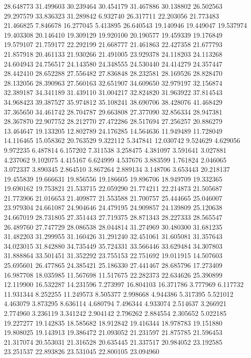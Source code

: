 28.648773
31.499603
30.239464
30.454179
31.467886
30.138802
26.502563
29.297579
33.836323
31.289842
6.932740
26.317711
22.203056
21.773483
21.466825
7.846678
16.277045
5.413895
26.640543
19.140946
19.449047
19.537974
19.403308
20.146410
19.309129
19.920100
20.190577
19.459339
19.176849
19.579107
21.759177
22.292199
21.668777
21.461863
22.427358
21.677793
21.857918
20.461133
21.930266
21.491005
23.929378
24.118203
24.113268
24.604943
24.756517
24.143580
24.348555
24.530440
24.414279
24.357447
28.442410
28.652288
27.556482
27.836848
28.232581
28.169526
28.828470
28.132056
28.390963
27.560163
32.651907
34.609650
32.979197
32.156874
32.389187
34.341189
31.439110
31.004217
32.824820
31.963922
37.814543
34.968423
39.387527
35.974812
35.108241
38.690706
38.428076
41.468429
37.365650
34.461742
28.704787
29.663808
27.377090
32.856334
28.947381
28.367870
22.907752
28.212770
27.472286
28.517694
27.256257
20.886279
13.464647
19.133205
12.802789
24.176285
14.564636
11.949489
11.728049
14.116465
15.058362
20.763529
9.322112
5.347841
12.030742
9.524629
4.629056
9.972235
6.487814
6.157202
7.311538
3.258475
4.381097
3.591641
3.027881
4.237062
9.102075
4.415167
6.624999
4.537676
3.883599
1.761824
2.046065
3.072337
3.890345
2.864510
3.867264
2.889134
3.148706
3.653443
20.218137
19.455839
19.666631
19.856556
19.186605
19.896706
18.949709
19.332365
19.690162
19.753821
21.533715
22.059290
21.774211
22.214873
21.505687
21.773906
21.016653
21.409877
21.553588
21.700757
25.444665
25.046007
23.979304
24.661087
24.904646
24.479195
24.909857
24.139809
25.120638
24.667019
28.731805
27.351443
27.719375
28.871343
28.227333
28.565547
26.489760
27.747729
28.086538
28.044814
31.274969
30.480300
31.681235
31.482203
31.299955
31.160426
31.291240
32.451061
31.605081
31.357643
34.023015
31.842880
34.735449
35.724331
33.566446
33.629484
34.307803
31.888864
33.501451
31.352292
23.755153
22.751692
19.011915
14.507603
25.695601
26.477865
24.385421
25.186330
27.441467
28.685796
17.273409
16.987708
18.035985
11.567698
11.517675
22.282373
22.634626
25.390899
12.119900
16.532287
14.231596
7.273997
16.804103
16.371786
3.777969
6.117732
11.931344
8.252255
11.249573
8.505377
2.998668
4.944386
5.317395
5.521012
4.463079
3.873295
8.636114
4.680794
7.496344
4.933074
2.514637
3.266921
2.774960
3.236119
3.341242
2.904142
2.796262
2.884554
2.305652
5.022185
19.227277
19.142835
18.585682
18.912842
19.416344
18.978783
19.151880
19.808025
19.143913
19.386472
21.093052
21.231597
21.875785
21.596453
21.317074
20.553031
21.316528
20.635445
21.337517
20.984052
23.192585
23.251537
22.893826
23.531045
22.800105
23.094960

